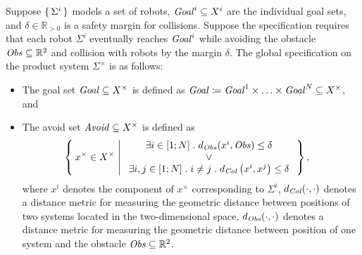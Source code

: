 Suppose $\set{\Sigma^i}$ 
models a set of robots, 
$\mathit{Goal}^i\subseteq X^i$ are the individual goal sets, and $\delta \in \mathbb{R}_{>0}$ is a safety margin for collisions. 
Suppose the specification requires that each robot $\Sigma^i$ eventually reaches $\mathit{Goal}^i$ 
while avoiding the obstacle $\mathit{Obs}\subseteq \mathbb{R}^2$ and collision with robots by the margin $\delta$.
The global specification on the product system $\Sigma^\times$ 
is as follows:
\begin{itemize}
	\item The goal set $\mathit{Goal}\subseteq X^\times$ is defined as $\mathit{Goal} \coloneqq \mathit{Goal}^1\times \ldots \times \mathit{Goal}^N \subseteq X^\times$, and
	\item The avoid set $\mathit{Avoid}\subseteq X^\times$ is defined as 
		\begin{align}
				&\Set{ x^\times\in X^\times | 
					\begin{array}{c}
						\exists i\in [1;N]\;.\; d_{\mathit{Obs}}(x^i,\mathit{Obs}) \leq \delta\\
						\vee\\
						 \exists i,j\in [1;N]\;.\;i\neq j\;.\;d_{\mathit{Col}}\left(x^i,x^j\right)\leq\delta
					\end{array}},
		\end{align}
	where $x^i$ denotes the component of $x^\times$ corresponding to $\Sigma^i$, $d_{\mathit{Col}}(\cdot,\cdot)$ denotes a distance metric for measuring the geometric distance between positions of two systems located in the two-dimensional space, $d_{\mathit{Obs}}(\cdot,\cdot)$ denotes a distance metric for measuring the geometric distance between position of one system and the obstacle $\mathit{Obs}\subseteq \mathbb{R}^2$.
\end{itemize}
%
%

